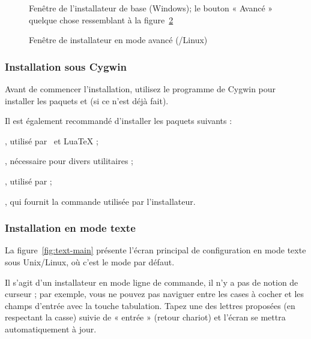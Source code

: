 \documentclass[german, english, french]{article}
\begin{document}
\begin{figure}[tb]
  \caption{Fenêtre de l'installateur de base (Windows); le bouton « Avancé »
    quelque chose ressemblant à la
    figure~\ref{fig:advanced-lnx}}\label{fig:basic-w32}
\end{figure}

\begin{figure}[tb]
  \caption{Fenêtre de installateur en mode \GUI{} avancé
    (\GNU/Linux)}\label{fig:advanced-lnx}
\end{figure}

\subsubsection{Installation sous Cygwin}
\label{sec:cygwin}

Avant de commencer l'installation, utilisez le programme  de
Cygwin pour installer les paquets  et  (si ce
n'est déjà fait).

Il est également recommandé d'installer les paquets suivants :
\begin{itemize*}
\item {}, utilisé par \XeTeX\ et Lua\TeX{} ;
\item {}, nécessaire pour divers utilitaires ;
\item {}, utilisé par  ;
\item {}, qui fournit la commande  utilisée par
  l'installateur.
\end{itemize*}

\subsubsection{Installation en mode texte}

La figure~\ref{fig:text-main} présente l'écran principal de configuration en
mode texte sous Unix/Linux, où c'est le mode par défaut.

Il s'agit d'un installateur en mode ligne de commande, il n'y a pas de notion de
curseur ; par exemple, vous ne pouvez pas naviguer entre les cases à cocher et
les champs d'entrée avec la touche tabulation. Tapez une des lettres proposées
(en respectant la casse) suivie de « entrée » (retour chariot) et l'écran se
mettra automatiquement à jour.
\end{document}
